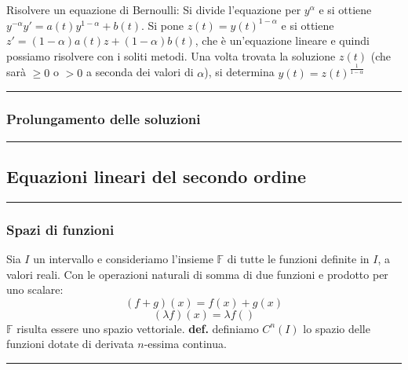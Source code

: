 \newline
Risolvere un equazione di Bernoulli:\newline
Si divide l'equazione per $y^\alpha$ e si ottiene $y^{-\alpha} y' = a(t) y^{1-\alpha} + b(t)$.\newline
Si pone $z(t) = y(t)^{1-\alpha}$ e si ottiene $z' = (1-\alpha)a(t)z + (1-\alpha) b(t)$, che è un'equazione lineare e quindi possiamo risolvere con i soliti metodi. Una volta trovata la soluzione $z(t)$ (che sarà $\geq 0$ o $>0$ a seconda dei valori di $\alpha$), si determina $y(t) = z(t)^{\frac{1}{1-\alpha}}$\newline
\rule{\textwidth}{0,4pt}
\subsubsection*{Prolungamento delle soluzioni}

\rule{\textwidth}{2pt}
\subsection*{Equazioni lineari del secondo ordine}
\rule{\textwidth}{0,4pt}
\subsubsection*{Spazi di funzioni}
Sia $I$ un intervallo e consideriamo l'insieme $\mathbb{F}$ di tutte le funzioni definite in $I$, a valori reali. Con le operazioni naturali di somma di due funzioni e prodotto per uno scalare:
\[
    (f+g)(x) = f(x) + g(x)
\]
\[
    (\lambda f)(x) = \lambda f()
\]
$\mathbb{F}$ risulta essere uno spazio vettoriale. \newline
\newline
\textbf{def.} definiamo $C^n(I)$ lo spazio delle funzioni dotate di derivata $n$-essima continua.\newline
\rule{\textwidth}{0,4pt}
